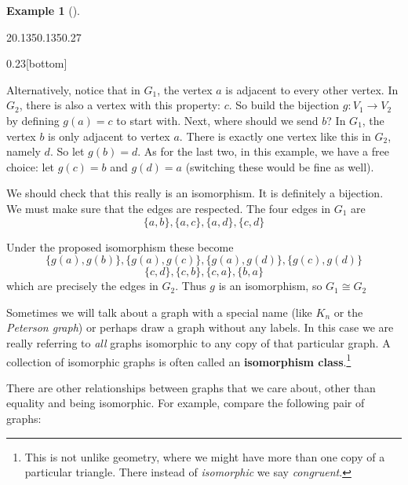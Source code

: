 \documentclass[10pt,]{book}
\newcommand{\terminology}[1]{\textbf{#1}}
\theoremstyle{plain}
\theoremstyle{definition}
\theoremstyle{definition}
\newtheorem{example}[theorem]{Example}
\theoremstyle{definition}
\theoremstyle{definition}
\numberwithin{equation}{chapter}
\newcommand{\vtx}[2]{node[fill,circle,inner sep=0pt, minimum size=4pt,label=#1:#2]{}}
\newcommand{\va}[1]{\vtx{above}{#1}}
\newcommand{\vb}[1]{\vtx{below}{#1}}
\newcommand{\vr}[1]{\vtx{right}{#1}}
\newcommand{\vl}[1]{\vtx{left}{#1}}
\begin{document}
\begin{example}[]
\begin{sidebyside}{2}{0.135}{0.135}{0.27}
\begin{sbspanel}{0.23}[bottom]
{{
}
}
\end{sbspanel}
\end{sidebyside}
\par
\hypertarget{p-51}{}%
Alternatively, notice that in \(G_1\), the vertex \(a\) is adjacent to every other vertex. In \(G_2\), there is also a vertex with this property: \(c\). So build the bijection \(g:V_1 \to V_2\) by defining \(g(a) = c\) to start with. Next, where should we send \(b\)? In \(G_1\), the vertex \(b\) is only adjacent to vertex \(a\). There is exactly one vertex like this in \(G_2\), namely \(d\). So let \(g(b) = d\). As for the last two, in this example, we have a free choice: let \(g(c) = b\) and \(g(d) = a\) (switching these would be fine as well).%
\par
\hypertarget{p-52}{}%
We should check that this really is an isomorphism. It is definitely a bijection. We must make sure that the edges are respected. The four edges in \(G_1\) are%
\begin{equation*}
\{a,b\}, \{a,c\}, \{a,d\}, \{c,d\}
\end{equation*}
%
\par
\hypertarget{p-53}{}%
Under the proposed isomorphism these become%
\begin{equation*}
\{g(a), g(b)\}, \{g(a), g(c)\}, \{g(a), g(d)\}, \{g(c), g(d)\}
\end{equation*}
%
\begin{equation*}
\{c,d\}, \{c,b\}, \{c,a\}, \{b,a\}
\end{equation*}
which are precisely the edges in \(G_2\). Thus \(g\) is an isomorphism, so \(G_1 \cong G_2\)%
\end{example}
\hypertarget{p-54}{}%
Sometimes we will talk about a graph with a special name (like \(K_n\) or the \emph{Peterson graph}) or perhaps draw a graph without any labels. In this case we are really referring to \emph{all} graphs isomorphic to any copy of that particular graph. A collection of isomorphic graphs is often called an \terminology{isomorphism class}.\footnote{This is not unlike geometry, where we might have more than one copy of a particular triangle. There instead of \emph{isomorphic} we say \emph{congruent}.\label{fn-1}}%
\par
\hypertarget{p-55}{}%
There are other relationships between graphs that we care about, other than equality and being isomorphic.  For example, compare the following pair of graphs:%
\end{document}
